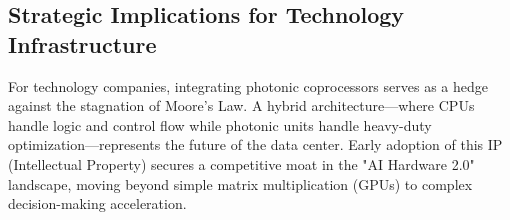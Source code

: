 \subsection{Strategic Implications for Technology Infrastructure}
For technology companies, integrating photonic coprocessors serves as a hedge against the stagnation of Moore's Law. A hybrid architecture—where CPUs handle logic and control flow while photonic units handle heavy-duty optimization—represents the future of the data center. Early adoption of this IP (Intellectual Property) secures a competitive moat in the "AI Hardware 2.0" landscape, moving beyond simple matrix multiplication (GPUs) to complex decision-making acceleration.
